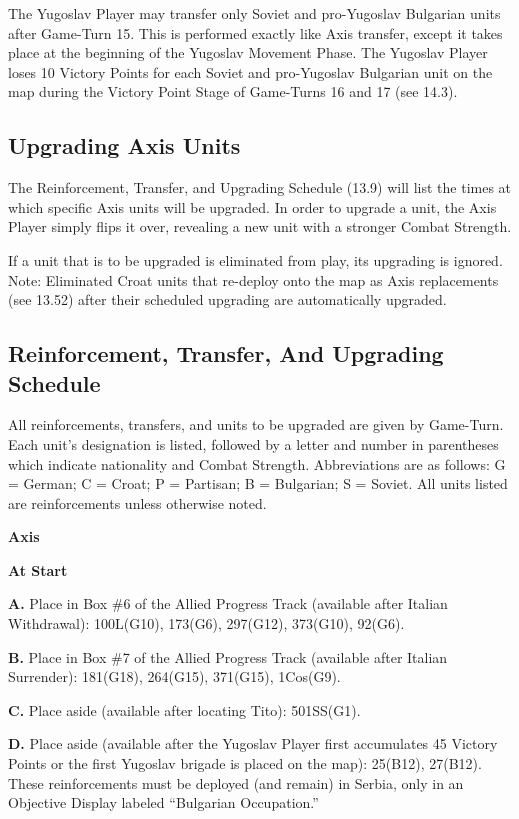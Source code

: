  The Yugoslav Player may transfer only Soviet and pro-Yugoslav Bulgarian units after Game-Turn 15. This is performed exactly like Axis transfer, except it takes place at the beginning of the Yugoslav Movement Phase. The Yugoslav Player loses 10 Victory Points for each Soviet and pro-Yugoslav Bulgarian unit on the map during the Victory Point Stage of Game-Turns 16 and 17 (see 14.3).

\subsection{Upgrading Axis Units}\label{sec:13.8}

 The Reinforcement, Transfer, and Upgrading Schedule (13.9) will list the times at which specific Axis units will be upgraded. In order to upgrade a unit, the Axis Player simply flips it over, revealing a new unit with a stronger Combat Strength.

 If a unit that is to be upgraded is eliminated from play, its upgrading is ignored. Note: Eliminated Croat units that re-deploy onto the map as Axis replacements (see 13.52) after their scheduled upgrading are automatically upgraded.

\subsection{Reinforcement, Transfer, And Upgrading Schedule}\label{sec:13.9}

All reinforcements, transfers, and units to be upgraded are given by Game-Turn. Each unit’s designation is listed, followed by a letter and number in parentheses which indicate nationality and Combat Strength. Abbreviations are as follows: G = German; C = Croat; P = Partisan; B = Bulgarian; S = Soviet. All units listed are reinforcements unless otherwise noted.

 \textbf{Axis}

\textbf{At Start}

\textbf{A.} Place in Box \#6 of the Allied Progress Track (available after
Italian Withdrawal): 100L(G10), 173(G6), 297(G12), 373(G10), 92(G6).

\textbf{B.} Place in Box \#7 of the Allied Progress Track (available after
Italian Surrender): 181(G18), 264(G15), 371(G15), 1Cos(G9).

\textbf{C.} Place aside (available after locating Tito): 501SS(G1).

\textbf{D.} Place aside (available after the Yugoslav Player first accumulates
45 Victory Points or the first Yugoslav brigade is placed on the map): 25(B12),
27(B12). These reinforcements must be deployed (and remain) in Serbia, only in
an Objective Display labeled ``Bulgarian Occupation.''


